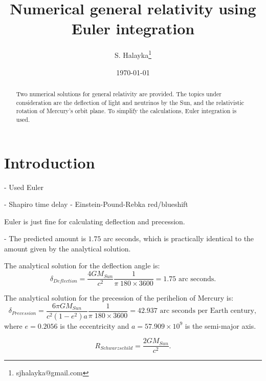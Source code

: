 \documentclass[12pt]{article}
\title{Numerical general relativity using Euler integration}
\author{S. Halayka\footnote{sjhalayka@gmail.com}}
\date{\today\;\currenttime}
\begin{document}
 
\maketitle

\begin{abstract}
Two numerical solutions for general relativity are provided.
The topics under consideration are the deflection of light and neutrinos by the Sun, and the relativistic rotation of Mercury's orbit plane.
To simplify the calculations, Euler integration is used.
\end{abstract}





\section{Introduction}

- Used Euler

- Shapiro time delay
- Einstein-Pound-Rebka red/blueshift







Euler is just fine for calculating deflection and precession.




- The predicted amount is $1.75$ arc seconds, which is practically identical to the amount given by the analytical solution.




The analytical solution for the deflection angle is:
\begin{equation}
\delta_{Deflection} = \frac{4GM_{Sun}}{c^2} \frac{1}{\pi\;180 \times 3600} = 1.75 \textrm{ arc seconds}.
\end{equation}

The analytical solution for the precession of the perihelion of Mercury is:
\begin{equation}
\delta_{Precession} = \frac{6 \pi GM_{Sun}}{c^2 (1 - e^2) a} \frac{1}{\pi\;180 \times 3600} = 42.937 \textrm{ arc seconds per Earth century},
\end{equation}
where $e = 0.2056$ is the eccentricity and $a = 57.909 \times 10^9$ is the semi-major axis.



\begin{equation}
R_{Schwarzschild} = \frac{2GM_{Sun}}{c^2}.
\end{equation}
\end{document}
